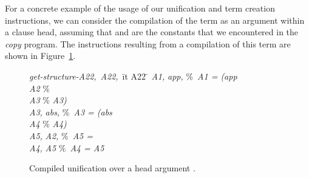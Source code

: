 For a concrete example of the usage of our unification and term creation
instructions, we can consider the compilation of the term
 as an argument within a clause head,
assuming that  and  are the constants that we encountered in
the {\it copy} program.
The instructions resulting from a compilation of this term are shown
in Figure~\ref{fig:unify_exp}.
\begin{figure}
\begin{tabbing}
\dquad\dquad\= {\it get-structure-}\dquad\={\it A22,}\ \={\it A22,}\ \={it A22} \= \kill
{}  \> {\it A1,}\> {\it app,} \> \%\ {\it A1 = (app\ }\= \\
 \> {\it A2}\>          \>        \> \%                   \=         \\
 \> {\it A3}\>          \>        \> \%                   \>         \> {\it A3)} \\
  \> {\it A3,}\> {\it abs,} \> \%\ {\it A3 = (abs\ } \\
 \> {\it A4}\>          \>        \> \%                   \> {\it A4)} \\
     \> {\it A5,}\> {\it A2,}  \> \%\ {\it A5 = } \\
  \> {\it A4,}\> {\it A5} \>        \> \%\ {\it A4 = A5}
\end{tabbing}
\caption{Compiled unification over a head argument .}\label{fig:unify_exp}
\end{figure}

